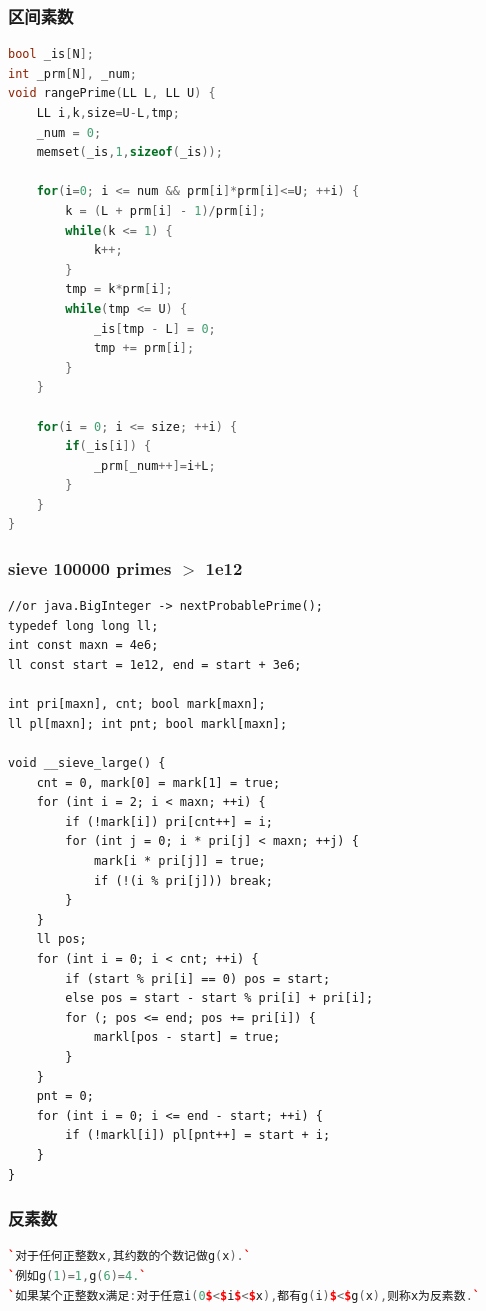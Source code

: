 \documentclass[a4paper]{article}
\begin{document}
\begin{CJK*}{UTF8}{gbsn}
\begin{multicols}{3}
\begin{flushleft}
\subsubsection{区间素数}
\begin{lstlisting}[language={c++}]
bool _is[N];
int _prm[N], _num;
void rangePrime(LL L, LL U) {
    LL i,k,size=U-L,tmp;
    _num = 0;
    memset(_is,1,sizeof(_is));

    for(i=0; i <= num && prm[i]*prm[i]<=U; ++i) {
        k = (L + prm[i] - 1)/prm[i];
        while(k <= 1) {
            k++;
        }
        tmp = k*prm[i];
        while(tmp <= U) {
            _is[tmp - L] = 0;
            tmp += prm[i];
        }
    }

    for(i = 0; i <= size; ++i) {
        if(_is[i]) {
            _prm[_num++]=i+L;
        }
    }
}
\end{lstlisting}

\subsubsection{sieve 100000 primes $>$ 1e12}
\begin{lstlisting}
//or java.BigInteger -> nextProbablePrime();
typedef long long ll;
int const maxn = 4e6;
ll const start = 1e12, end = start + 3e6;

int pri[maxn], cnt; bool mark[maxn];
ll pl[maxn]; int pnt; bool markl[maxn];

void __sieve_large() {
    cnt = 0, mark[0] = mark[1] = true;
    for (int i = 2; i < maxn; ++i) {
        if (!mark[i]) pri[cnt++] = i;
        for (int j = 0; i * pri[j] < maxn; ++j) {
            mark[i * pri[j]] = true;
            if (!(i % pri[j])) break;
        }
    }
    ll pos;
    for (int i = 0; i < cnt; ++i) {
        if (start % pri[i] == 0) pos = start;
        else pos = start - start % pri[i] + pri[i];
        for (; pos <= end; pos += pri[i]) {
            markl[pos - start] = true;
        }
    }
    pnt = 0;
    for (int i = 0; i <= end - start; ++i) {
        if (!markl[i]) pl[pnt++] = start + i;
    }
}
\end{lstlisting}

\subsubsection{反素数}

\begin{lstlisting}[language={c++}]
`对于任何正整数x,其约数的个数记做g(x).`
`例如g(1)=1,g(6)=4.`
`如果某个正整数x满足:对于任意i(0$<$i$<$x),都有g(i)$<$g(x),则称x为反素数.`


\end{lstlisting}
\end{flushleft}
\end{multicols}
\end{CJK*}
\end{document}
